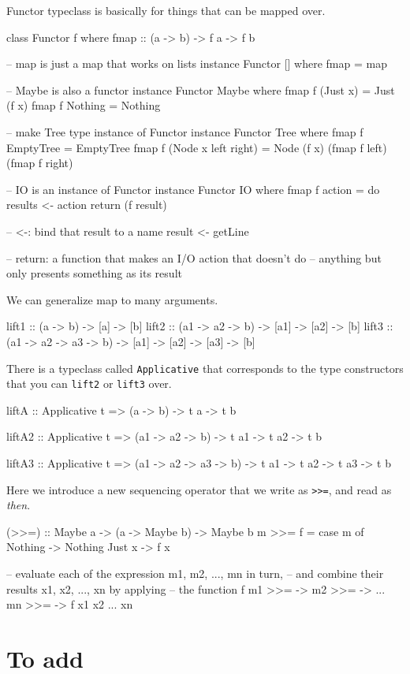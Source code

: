 Functor typeclass is basically for things that can be mapped over. 
\begin{haskellcode}
class Functor f where  
    fmap :: (a -> b) -> f a -> f b

-- map is just a map that works on lists
instance Functor [] where
    fmap = map

-- Maybe is also a functor
instance Functor Maybe where
    fmap f (Just x) = Just (f x)
    fmap f Nothing = Nothing

-- make Tree type instance of Functor
instance Functor Tree where
    fmap f EmptyTree = EmptyTree
    fmap f (Node x left right) = Node (f x) 
           (fmap f left) (fmap f right)

-- IO is an instance of Functor
instance Functor IO where
    fmap f action = do
        results <- action
        return (f result)

-- <-: bind that result to a name
result <- getLine

-- return: a function that makes an I/O action that doesn't do 
--         anything but only presents something as its result

\end{haskellcode}


We can generalize map to many arguments.
\begin{haskellcode}
lift1 :: (a -> b) -> [a] -> [b]
lift2 :: (a1 -> a2 -> b) -> [a1] -> [a2] -> [b]
lift3 :: (a1 -> a2 -> a3 -> b) -> [a1] -> [a2] -> [a3] -> [b]
\end{haskellcode}

There is a typeclass called \texttt{Applicative} that corresponds to 
the type constructors that you can \texttt{lift2} or \texttt{lift3} over.

\begin{haskellcode}
liftA  :: Applicative t => (a -> b) -> t a -> t b

liftA2 :: Applicative t 
       => (a1 -> a2 -> b) 
       -> t a1 
       -> t a2 
       -> t b

liftA3 :: Applicative t 
       => (a1 -> a2 -> a3 -> b) 
       -> t a1 
       -> t a2
       -> t a3
       -> t b
\end{haskellcode}   


Here we introduce a new sequencing operator that we write as 
\texttt{>>=}, and read as \textit{then}.

\begin{haskellcode}
(>>=)   :: Maybe a -> (a -> Maybe b) -> Maybe b
m >>= f =  case m of
             Nothing -> Nothing
             Just x  -> f x

-- evaluate each of the expression m1, m2, ..., mn in turn,
-- and combine their results x1, x2, ..., xn by applying 
-- the function f
m1 >>=  ->
  m2 >>=  ->
  ...
    mn >>= \xn ->
      f x1 x2 ... xn
\end{haskellcode}

\section{To add}